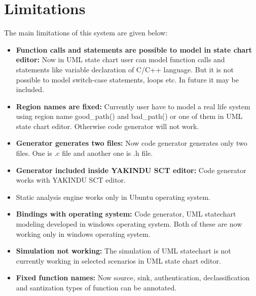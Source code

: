 \chapter{Limitations}
The main limitations of this system are given below:
\begin{itemize}
	\item \textbf{Function calls and statements are possible to model in state chart editor:} Now in UML state chart user can model function calls and statements like variable declaration of C/C++ language. But it is not possible to model switch-case statements, loops etc. In future it may be included.
	
	\item \textbf{Region names are fixed:} Currently user have to model a real life system using region name good\_path() and bad\_path() or one of them in UML state chart editor. Otherwise code generator will not work.
	
	\item \textbf{Generator generates two files:} Now code generator generates only two files. One is .c file and another one is .h file.
	
	\item \textbf{Generator included inside YAKINDU SCT editor:} Code generator works with YAKINDU SCT editor.
	
	\item Static analysis engine works only in Ubuntu operating system.
	
	\item \textbf{Bindings with operating system:}  Code generator, UML statechart modeling developed in windows operating system. Both of these are now working only in windows operating system.
	
	\item \textbf{Simulation not working:} The simulation of UML statechart is not currently working in selected scenarios in UML state chart editor.
	
	\item \textbf{Fixed function names:} Now source, sink, authentication, declassification and santization types of function can be annotated. 
	
\end{itemize}